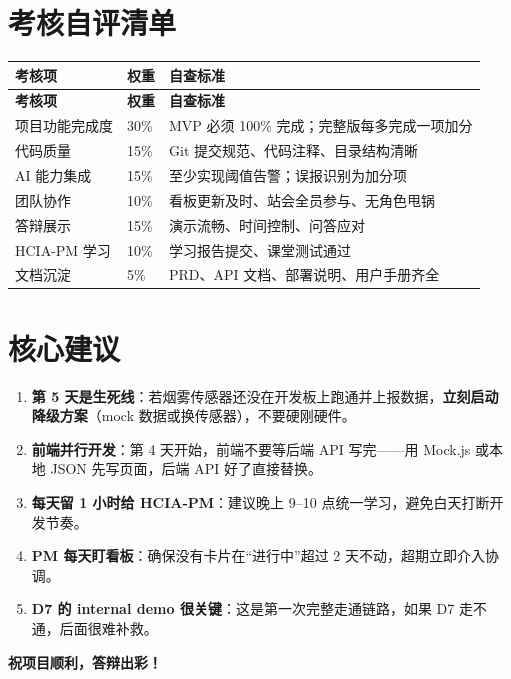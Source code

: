 \documentclass[UTF8,12pt,a4paper]{ctexart}
\begin{document}
\section{考核自评清单}

\begin{longtable}{L{3.5cm}C{1.5cm}L{9cm}}
\toprule
\textbf{考核项} & \textbf{权重} & \textbf{自查标准} \\
\midrule
\endfirsthead
\toprule
\textbf{考核项} & \textbf{权重} & \textbf{自查标准} \\
\midrule
\endhead
\bottomrule
\endfoot

项目功能完成度 & 30\% & MVP 必须 100\% 完成；完整版每多完成一项加分 \\
\midrule
代码质量 & 15\% & Git 提交规范、代码注释、目录结构清晰 \\
\midrule
AI 能力集成 & 15\% & 至少实现阈值告警；误报识别为加分项 \\
\midrule
团队协作 & 10\% & 看板更新及时、站会全员参与、无角色甩锅 \\
\midrule
答辩展示 & 15\% & 演示流畅、时间控制、问答应对 \\
\midrule
HCIA-PM 学习 & 10\% & 学习报告提交、课堂测试通过 \\
\midrule
文档沉淀 & 5\% & PRD、API 文档、部署说明、用户手册齐全 \\
\bottomrule
\end{longtable}

\section*{核心建议}

\begin{enumerate}
  \item \textbf{第 5 天是生死线}：若烟雾传感器还没在开发板上跑通并上报数据，\textbf{立刻启动降级方案}（mock 数据或换传感器），不要硬刚硬件。
  \item \textbf{前端并行开发}：第 4 天开始，前端不要等后端 API 写完——用 Mock.js 或本地 JSON 先写页面，后端 API 好了直接替换。
  \item \textbf{每天留 1 小时给 HCIA-PM}：建议晚上 9--10 点统一学习，避免白天打断开发节奏。
  \item \textbf{PM 每天盯看板}：确保没有卡片在“进行中”超过 2 天不动，超期立即介入协调。
  \item \textbf{D7 的 internal demo 很关键}：这是第一次完整走通链路，如果 D7 走不通，后面很难补救。
\end{enumerate}

\vspace{1cm}
\begin{center}
\textcolor{mainblue}{\Large\bfseries 祝项目顺利，答辩出彩！}
\end{center}
\end{document}
